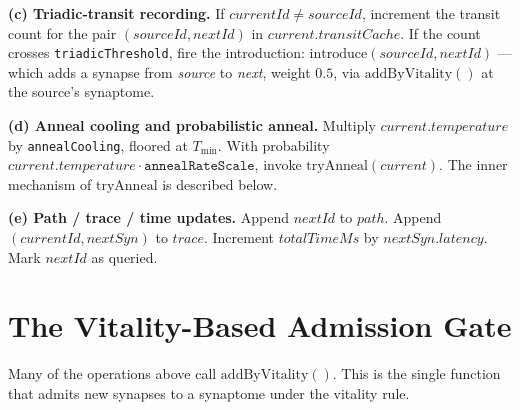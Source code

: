 \documentclass[twoside,nobib]{tufte-book}
\begin{document}
\textbf{(c) Triadic-transit recording.} If $\mathit{currentId}
\neq \mathit{sourceId}$, increment the transit count for the
pair $(\mathit{sourceId}, \mathit{nextId})$ in
$\mathit{current}.\mathit{transitCache}$. If the count crosses
\texttt{triadicThreshold}, fire the introduction:
$\mathrm{introduce}(\mathit{sourceId}, \mathit{nextId})$ ---
which adds a synapse from \emph{source} to \emph{next}, weight
$0.5$, via $\mathrm{addByVitality}()$ at the source's synaptome.

\textbf{(d) Anneal cooling and probabilistic anneal.} Multiply
$\mathit{current}.\mathit{temperature}$ by \texttt{annealCooling},
floored at $T_{\min}$. With probability
$\mathit{current}.\mathit{temperature} \cdot \texttt{annealRateScale}$,
invoke $\mathrm{tryAnneal}(\mathit{current})$. The inner mechanism
of $\mathrm{tryAnneal}$ is described below.

\textbf{(e) Path / trace / time updates.} Append $\mathit{nextId}$
to $\mathit{path}$. Append $(\mathit{currentId}, \mathit{nextSyn})$
to $\mathit{trace}$. Increment $\mathit{totalTimeMs}$ by
$\mathit{nextSyn}.\mathit{latency}$. Mark $\mathit{nextId}$ as
queried.

\section{The Vitality-Based Admission Gate}

Many of the operations above call $\mathrm{addByVitality}()$.
This is the single function that admits new synapses to a
synaptome under the vitality rule.
\end{document}
